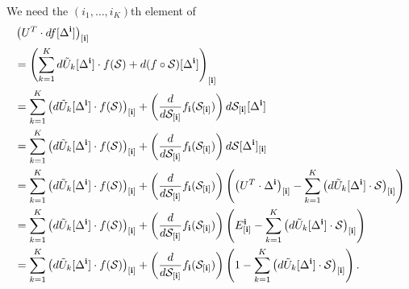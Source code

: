 We need the $(i_1,\ldots,i_K)$th element of
\begin{align}
  &\left(U^T \cdot df[\Delta^{\bf i}]\right)_{[\mathbf{i}]} \nonumber\\
  &= \left(\sum_{k=1}^Kd\tilde{U}_k[\Delta^{\bf i}] \cdot f(\mathcal{S}) + d(f \circ \mathcal{S})[\Delta^{\bf i}]\right)_{[\mathbf{i}]}\nonumber\\
  &= \sum_{k=1}^K\left(d\tilde{U}_k[\Delta^{\bf i}] \cdot f(\mathcal{S})\right)_{[\mathbf{i}]} + \left(\frac{d}{d\mathcal{S}_{[\mathbf{i}]}}f_{\mathbf{i}}(\mathcal{S}_{[\mathbf{i}]})\right) d\mathcal{S}_{[\mathbf{i}]}[\Delta^{\bf i}]\nonumber\\
  &= \sum_{k=1}^K\left(d\tilde{U}_k[\Delta^{\bf i}] \cdot f(\mathcal{S})\right)_{[\mathbf{i}]} + \left(\frac{d}{d\mathcal{S}_{[\mathbf{i}]}}f_{\mathbf{i}}(\mathcal{S}_{[\mathbf{i}]})\right) d\mathcal{S}[\Delta^{\bf i}]_{[\mathbf{i}]}\nonumber\\
  &= \sum_{k=1}^K\left(d\tilde{U}_k[\Delta^{\bf i}] \cdot f(\mathcal{S})\right)_{[\mathbf{i}]} + \left(\frac{d}{d\mathcal{S}_{[\mathbf{i}]}}f_{\mathbf{i}}(\mathcal{S}_{[\mathbf{i}]})\right) \left(\left(U^T \cdot \Delta^{\bf i}\right)_{[\mathbf{i}]} - \sum_{k=1}^K \left(d\tilde{U}_k[\Delta^{\bf i}]\cdot \mathcal{S}\right)_{[\mathbf{i}]} \right) \nonumber\\
  &= \sum_{k=1}^K\left(d\tilde{U}_k[\Delta^{\bf i}] \cdot f(\mathcal{S})\right)_{[\mathbf{i}]} + \left(\frac{d}{d\mathcal{S}_{[\mathbf{i}]}}f_{\mathbf{i}}(\mathcal{S}_{[\mathbf{i}]})\right) \left(E^{\bf i}_{[\mathbf{i}]} - \sum_{k=1}^K \left(d\tilde{U}_k[\Delta^{\bf i}]\cdot \mathcal{S}\right)_{[\mathbf{i}]} \right) \nonumber\\
  &= \sum_{k=1}^K\left(d\tilde{U}_k[\Delta^{\bf i}] \cdot f(\mathcal{S})\right)_{[\mathbf{i}]} + \left(\frac{d}{d\mathcal{S}_{[\mathbf{i}]}}f_{\mathbf{i}}(\mathcal{S}_{[\mathbf{i}]})\right) \left(1 - \sum_{k=1}^K \left(d\tilde{U}_k[\Delta^{\bf i}]\cdot \mathcal{S}\right)_{[\mathbf{i}]} \right).  \label{equation:final.of.right.simp}
\end{align}


